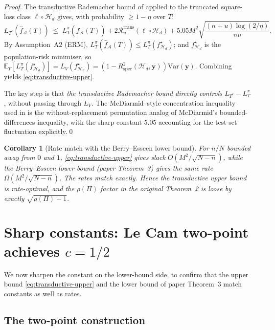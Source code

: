 \documentclass[11pt,a4paper]{article}
\theoremstyle{plain}
\newtheorem{corollary}[theorem]{Corollary}
\theoremstyle{definition}
\theoremstyle{remark}
\newcommand{\by}{\mathbf{y}}
\newcommand{\E}{\mathbb{E}}
\newcommand{\Var}{\mathrm{Var}}
\newcommand{\Rspec}{R^2_{\mathrm{spec}}}
\newcommand{\Acal}{\mathcal{A}}
\newcommand{\Hcal}{\mathcal{H}}
\newcommand{\Rcal}{\mathcal{R}}
\begin{document}
\begin{proof}
The transductive Rademacher bound of
\citet[][Theorem~1]{ElYanivPechyony2006} applied to the truncated
square-loss class $\ell \circ \Hcal_d$ gives, with probability
$\geq 1 - \eta$ over $T$:
\begin{equation*}
    L_{T^c}(\hat f_\Acal(T))
    \;\leq\; L_T^\pi(\hat f_\Acal(T))
        + 2 \Rcal_n^{\mathrm{trans}}(\ell \circ \Hcal_d)
        + 5.05 M^2 \sqrt{\frac{(n+u)\log(2/\eta)}{n u}}.
\end{equation*}
By Assumption~A2 (ERM), $L_T^\pi(\hat f_\Acal(T)) \leq L_T^\pi(f^\star_{\Hcal_d})$;
and $f^\star_{\Hcal_d}$ is the population-risk minimiser, so
$\E_T[L_T^\pi(f^\star_{\Hcal_d})] = L_V(f^\star_{\Hcal_d}) = (1 -
\Rspec(\Hcal_d, \by))\Var(\by)$.  Combining yields
\eqref{eq:transductive-upper}.

The key step is that \emph{the transductive Rademacher bound directly
controls $L_{T^c} - L_T^\pi$}, without passing through $L_V$.  The
McDiarmid--style concentration inequality used in
\citet{ElYanivPechyony2006} is the without-replacement permutation
analog of McDiarmid's bounded-differences inequality, with the
sharp constant $5.05$ accounting for the test-set fluctuation
explicitly.\qed
\end{proof}

\begin{corollary}[Rate match with the Berry--Esseen lower bound]
\label{cor:rate-match}
For $n/N$ bounded away from $0$ and $1$,
\eqref{eq:transductive-upper} gives slack $O(M^2/\sqrt{N-n})$, while
the Berry--Esseen lower bound (paper Theorem~3) gives the same rate
$\Omega(M^2/\sqrt{N-n})$.  The rates match exactly.  Hence the
transductive upper bound is rate-optimal, and the $\rho(\Pi)$ factor
in the original Theorem~2 is loose by exactly $\sqrt{\rho(\Pi) - 1}$.
\end{corollary}

\section{Sharp constants: Le Cam two-point achieves $c = 1/2$}
\label{sec:le-cam-sharp}

We now sharpen the constant on the lower-bound side, to confirm that
the upper bound \eqref{eq:transductive-upper} and the lower bound
of paper Theorem~3 match constants as well as rates.

\subsection{The two-point construction}
\end{document}
